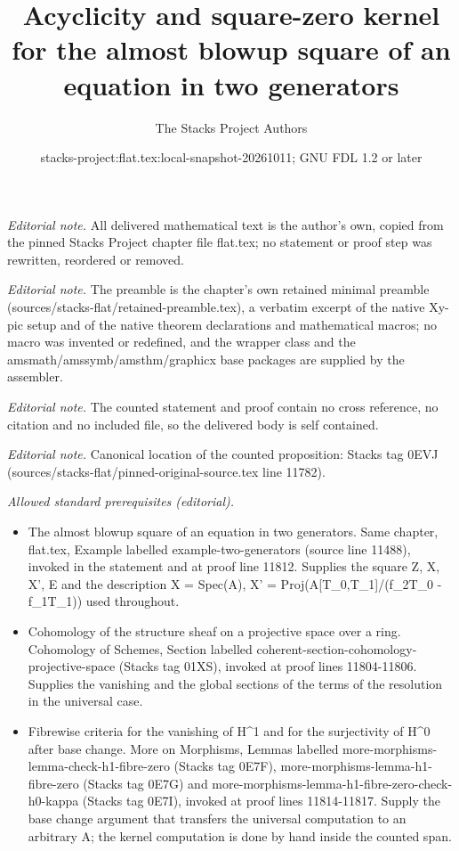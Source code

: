 \documentclass[10pt,a4paper]{amsart}
\title{Acyclicity and square-zero kernel for the almost blowup square of an equation in two generators}
\author{The Stacks Project Authors}
\date{stacks-project:flat.tex:local-snapshot-20261011; GNU FDL 1.2 or later}
\theoremstyle{plain}
\theoremstyle{definition}
\theoremstyle{remark}
\numberwithin{equation}{subsection}
\begin{document}
\maketitle
\noindent\textit{Editorial note.} All delivered mathematical text is the author's own, copied from the pinned Stacks Project chapter file flat.tex; no statement or proof step was rewritten, reordered or removed.\par\medskip
\noindent\textit{Editorial note.} The preamble is the chapter's own retained minimal preamble (sources/stacks-flat/retained-preamble.tex), a verbatim excerpt of the native Xy-pic setup and of the native theorem declarations and mathematical macros; no macro was invented or redefined, and the wrapper class and the amsmath/amssymb/amsthm/graphicx base packages are supplied by the assembler.\par\medskip
\noindent\textit{Editorial note.} The counted statement and proof contain no cross reference, no citation and no included file, so the delivered body is self contained.\par\medskip
\noindent\textit{Editorial note.} Canonical location of the counted proposition: Stacks tag 0EVJ (sources/stacks-flat/pinned-original-source.tex line 11782).\par\medskip
\noindent\textit{Allowed standard prerequisites (editorial).}\begin{itemize}
\item The almost blowup square of an equation in two generators. Same chapter, flat.tex, Example labelled example-two-generators (source line 11488), invoked in the statement and at proof line 11812. Supplies the square Z, X, X', E and the description X = Spec(A), X' = Proj(A[T\_0,T\_1]/(f\_2T\_0 - f\_1T\_1)) used throughout.
\item Cohomology of the structure sheaf on a projective space over a ring. Cohomology of Schemes, Section labelled coherent-section-cohomology-projective-space (Stacks tag 01XS), invoked at proof lines 11804-11806. Supplies the vanishing and the global sections of the terms of the resolution in the universal case.
\item Fibrewise criteria for the vanishing of H\textasciicircum{}1 and for the surjectivity of H\textasciicircum{}0 after base change. More on Morphisms, Lemmas labelled more-morphisms-lemma-check-h1-fibre-zero (Stacks tag 0E7F), more-morphisms-lemma-h1-fibre-zero (Stacks tag 0E7G) and more-morphisms-lemma-h1-fibre-zero-check-h0-kappa (Stacks tag 0E7I), invoked at proof lines 11814-11817. Supply the base change argument that transfers the universal computation to an arbitrary A; the kernel computation is done by hand inside the counted span.
\end{itemize}\medskip
\end{document}
